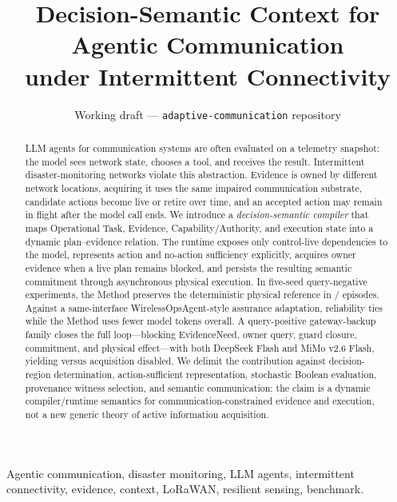 \documentclass[journal,10pt]{IEEEtran}
\title{\textbf{Decision-Semantic Context for Agentic Communication\\
under Intermittent Connectivity}}
\author{Working draft --- \texttt{adaptive-communication} repository}
\date{}
\begin{document}
\maketitle

\begin{abstract}
LLM agents for communication systems are often evaluated on a telemetry snapshot: the model sees
network state, chooses a tool, and receives the result. Intermittent disaster-monitoring networks
violate this abstraction. Evidence is owned by different network locations, acquiring it uses the
same impaired communication substrate, candidate actions become live or retire over time, and an
accepted action may remain in flight after the model call ends. We introduce a
\emph{decision-semantic compiler} that maps Operational Task, Evidence, Capability/Authority, and
execution state into a dynamic plan--evidence relation. The runtime exposes only control-live
dependencies to the model, represents action and no-action sufficiency explicitly, acquires owner
evidence when a live plan remains blocked, and persists the resulting semantic commitment through
asynchronous physical execution. In five-seed query-negative experiments, the Method preserves the
deterministic physical reference in \AgenticMainPhysicalExactEpisodes/\AgenticMainMethodEpisodes{}
episodes. Against a same-interface WirelessOpsAgent-style assurance adaptation, reliability ties
while the Method uses \AgenticWOATokenReductionOverall{} fewer model tokens overall. A
query-positive gateway-backup family closes the full loop---blocking EvidenceNeed, owner query,
guard closure, commitment, and physical effect---with both DeepSeek Flash and MiMo v2.6 Flash,
yielding \AgenticQPGain{} versus acquisition disabled. We delimit the contribution against
decision-region determination, action-sufficient representation, stochastic Boolean evaluation,
provenance witness selection, and semantic communication: the claim is a dynamic
compiler/runtime semantics for communication-constrained evidence and execution, not a new
generic theory of active information acquisition.
\end{abstract}

\begin{IEEEkeywords}
Agentic communication, disaster monitoring, LLM agents, intermittent connectivity, evidence,
context, LoRaWAN, resilient sensing, benchmark.
\end{IEEEkeywords}
\end{document}

